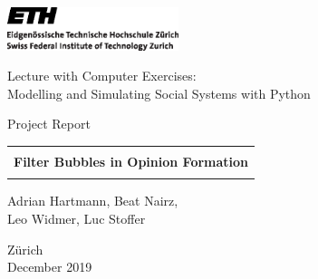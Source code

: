 
\thispagestyle{empty}

\begin{center}
\includegraphics[width=5cm]{ETHlogo.eps}

\bigskip
\bigskip
\bigskip


\LARGE{ 	Lecture with Computer Exercises:\\ }
\LARGE{ Modelling and Simulating Social Systems with Python\\}

\bigskip
\bigskip

\small{Project Report}\\

\bigskip
\bigskip
\bigskip
\bigskip


\begin{tabular}{c}
\hline
\\
\textbf{\LARGE{Filter Bubbles in Opinion Formation}}\\

\\
\hline
\end{tabular}
\vspace{40pt}

\LARGE{Adrian Hartmann, Beat Nairz,\\ Leo Widmer, Luc Stoffer}

\vspace{100pt}

Zürich\\
December 2019\\

\end{center}


